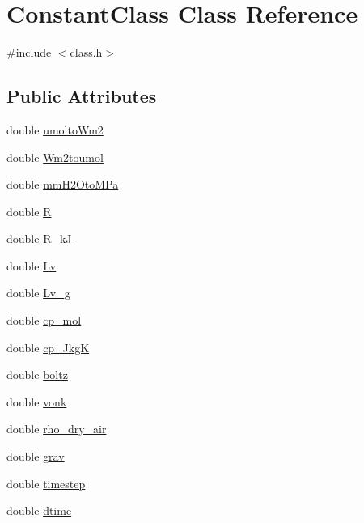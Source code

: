 \hypertarget{class_constant_class}{}\section{Constant\+Class Class Reference}
\label{class_constant_class}


{\ttfamily \#include $<$class.\+h$>$}

\subsection*{Public Attributes}
\begin{DoxyCompactItemize}
\item 
double \hyperlink{class_constant_class_ad1ea4fff2572cb876ce6bca6bde16f4a}{umolto\+Wm2}
\item 
double \hyperlink{class_constant_class_accf26e7a6c9dc0b374803e7b2ecf1513}{Wm2toumol}
\item 
double \hyperlink{class_constant_class_aea6632eee77c13f49e9e53d6e4a34627}{mm\+H2\+Oto\+M\+Pa}
\item 
double \hyperlink{class_constant_class_a01dd09300ed3c500f6bb5cf919b8b31d}{R}
\item 
double \hyperlink{class_constant_class_a1e17cc2db811a4fb4611900ef911dcd2}{R\+\_\+kJ}
\item 
double \hyperlink{class_constant_class_a41510b15312b51a485b144f58915f8f2}{Lv}
\item 
double \hyperlink{class_constant_class_a870679f8a2ea3c61aadba49638acbfcc}{Lv\+\_\+g}
\item 
double \hyperlink{class_constant_class_a4e97e0476d14f98c5968a97d22adb639}{cp\+\_\+mol}
\item 
double \hyperlink{class_constant_class_aa8d7869ffc0e4e0670c64a0846ab660f}{cp\+\_\+\+JkgK}
\item 
double \hyperlink{class_constant_class_a1af392a4d4fdb794fc88c88e4a08f944}{boltz}
\item 
double \hyperlink{class_constant_class_a2484f7693e2aa0c9b9eb8cbfc21407aa}{vonk}
\item 
double \hyperlink{class_constant_class_a7cd6e8105c2916fb255bbb69cb32a83d}{rho\+\_\+dry\+\_\+air}
\item 
double \hyperlink{class_constant_class_aad0571ba338430398a4e571387f748e1}{grav}
\item 
double \hyperlink{class_constant_class_aa03d2567eed125999591779ae17de6ab}{timestep}
\item 
double \hyperlink{class_constant_class_a89dc61f75fbf33c2125731cc70fd6eb2}{dtime}
\end{DoxyCompactItemize}


